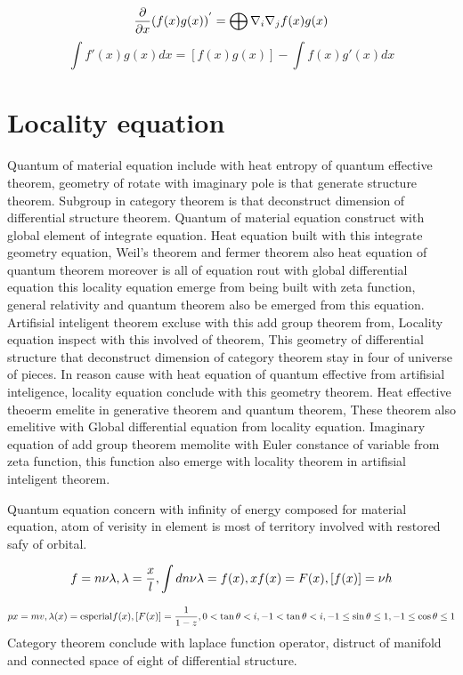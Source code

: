 \documentclass{jsarticle}
\begin{document}
			 $$ {\partial \over \partial x}(f(x)g(x))^{'} = \bigoplus \nabla_{i}\nabla_{j} 
			 f(x)g(x) $$ 
			 $$ \int f'(x)g(x)dx = [f(x)g(x)] - \int f(x)g'(x)dx $$

\section{Locality equation}
  Quantum of material equation include with heat entropy of quantum effective theorem,
geometry of rotate with imaginary pole is that generate structure theorem.
Subgroup in category theorem is that deconstruct dimension of differential structure theorem.
Quantum of material equation construct with global element of integrate equation.
Heat equation built with this integrate geometry equation,
Weil's theorem and fermer theorem also heat equation of quantum theorem moreover is
all of equation rout with global differential equation
this locality equation emerge from being built with zeta function,
general relativity and quantum theorem also be emerged from this equation.
Artifisial inteligent theorem excluse with this add group theorem from,
Locality equation inspect with this involved of theorem,
This geometry of differential structure that deconstruct dimension of category theorem
stay in four of universe of pieces.
In reason cause with heat equation of quantum effective from artifisial inteligence,
locality equation conclude with this geometry theorem.
Heat effective theoerm emelite in generative theorem and quantum theorem,
These theorem also emelitive with Global differential equation from locality equation.
Imaginary equation of add group theorem memolite with Euler constance of variable from zeta function, 
this function also emerge with locality theorem in artifisial inteligent theorem.

 Quantum equation concern with infinity of energy composed for material equation, atom of verisity in element is most of territory
involved with restored safy of orbital.


$$ f = n\nu\lambda , \lambda = {x \over l},
 \int dn \nu \lambda = f(x), 
 xf(x) = F(x),
 [f(x)] = \nu h$$

$$ px = mv,  \lambda (x) = \mathrm{esperial} f(x), 
 [F(x)] = {1 \over {1 - z}}, 
 0 <  \tan \theta < i, -1 < \tan \theta < i, 
 -1 \le \sin \theta \le 1, 
 -1 \le \cos \theta \le 1 $$
  Category theorem conclude with laplace function operator, distruct of manifold
and connected space of eight of differential structure.
\end{document}
